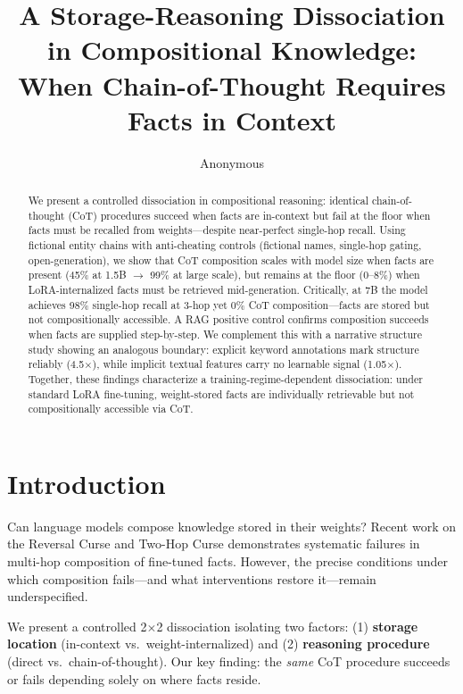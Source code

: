 \documentclass[11pt]{article}
\title{A Storage-Reasoning Dissociation in Compositional Knowledge:\\When Chain-of-Thought Requires Facts in Context}
\author{Anonymous}
\begin{document}
\maketitle

\begin{abstract}
We present a controlled dissociation in compositional reasoning: identical chain-of-thought (CoT) procedures succeed when facts are in-context but fail at the floor when facts must be recalled from weights---despite near-perfect single-hop recall. Using fictional entity chains with anti-cheating controls (fictional names, single-hop gating, open-generation), we show that CoT composition scales with model size when facts are present (45\% at 1.5B $\rightarrow$ 99\% at large scale), but remains at the floor (0--8\%) when LoRA-internalized facts must be retrieved mid-generation. Critically, at 7B the model achieves 98\% single-hop recall at 3-hop yet 0\% CoT composition---facts are stored but not compositionally accessible. A RAG positive control confirms composition succeeds when facts are supplied step-by-step. We complement this with a narrative structure study showing an analogous boundary: explicit keyword annotations mark structure reliably (4.5$\times$), while implicit textual features carry no learnable signal (1.05$\times$). Together, these findings characterize a training-regime-dependent dissociation: under standard LoRA fine-tuning, weight-stored facts are individually retrievable but not compositionally accessible via CoT.
\end{abstract}

\section{Introduction}

Can language models compose knowledge stored in their weights? Recent work on the Reversal Curse \cite{berglund2023reversal} and Two-Hop Curse \cite{balesni2024twohop} demonstrates systematic failures in multi-hop composition of fine-tuned facts. However, the precise conditions under which composition fails---and what interventions restore it---remain underspecified.

We present a controlled 2$\times$2 dissociation isolating two factors: (1) \textbf{storage location} (in-context vs.\ weight-internalized) and (2) \textbf{reasoning procedure} (direct vs.\ chain-of-thought). Our key finding: the \emph{same} CoT procedure succeeds or fails depending solely on where facts reside.
\end{document}
